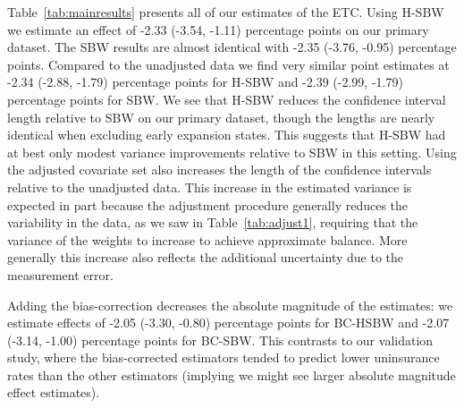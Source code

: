 \documentclass[aoas]{imsart}
\theoremstyle{plain}
\theoremstyle{remark}
\begin{document}
Table~\ref{tab:mainresults} presents all of our estimates of the ETC. Using H-SBW we estimate an effect of -2.33 (-3.54, -1.11) percentage points on our primary dataset. The SBW results are almost identical with -2.35 (-3.76, -0.95) percentage points. Compared to the unadjusted data we find very similar point estimates at -2.34 (-2.88, -1.79) percentage points for H-SBW and -2.39 (-2.99, -1.79) percentage points for SBW. We see that H-SBW reduces the confidence interval length relative to SBW on our primary dataset, though the lengths are nearly identical when excluding early expansion states. This suggests that H-SBW had at best only modest variance improvements relative to SBW in this setting. Using the adjusted covariate set also increases the length of the confidence intervals relative to the unadjusted data. This increase in the estimated variance is expected in part because the adjustment procedure generally reduces the variability in the data, as we saw in Table~\ref{tab:adjust1}, requiring that the variance of the weights to increase to achieve approximate balance. More generally this increase also reflects the additional uncertainty due to the measurement error.

Adding the bias-correction decreases the absolute magnitude of the estimates: we estimate effects of -2.05 (-3.30, -0.80) percentage points for BC-HSBW and -2.07 (-3.14, -1.00) percentage points for BC-SBW. This contrasts to our validation study, where the bias-corrected estimators tended to predict lower uninsurance rates than the other estimators (implying we might see larger absolute magnitude effect estimates).
\end{document}
